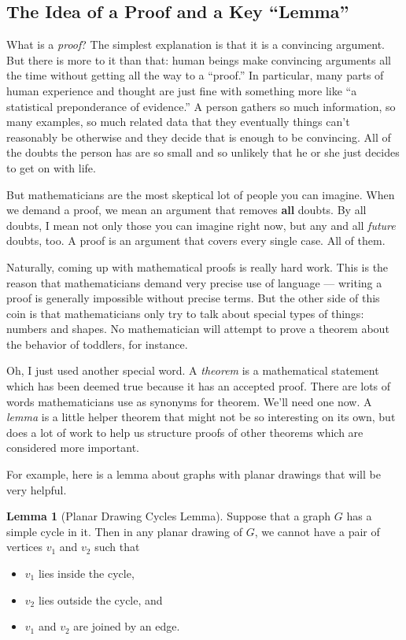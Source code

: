 \documentclass[12pt,letterpaper]{article}
\theoremstyle{definition}
\newtheorem*{lemma}{Lemma}
\begin{document}
\subsection*{The Idea of a Proof and a Key ``Lemma''}

What is a \emph{proof}? The simplest explanation is that it is a convincing argument. But there is more to it 
than that: human beings make convincing arguments all the time without getting all the way to a ``proof.'' 
In particular, many parts of human experience and thought are just fine with something more like ``a statistical 
preponderance of evidence.'' A person gathers so much information, so many examples, so much related data that 
they eventually things can't reasonably be otherwise and they decide that is enough to be convincing. All of the doubts the person has are so small and so unlikely that he or she just decides to get on with life.

But mathematicians are the most skeptical lot of people you can imagine. When we demand a proof, we mean an 
argument that removes \textbf{all} doubts. By all doubts, I mean not only those you can imagine right now, but any
and all \emph{future} doubts, too. A proof is an argument that covers every single case. All of them.

Naturally, coming up with mathematical proofs is really hard work. This is the reason that mathematicians demand
very precise use of language ---  writing a proof is generally impossible without precise terms. But the other 
side of this coin is that mathematicians only try to talk about special types of things: numbers and shapes. No
mathematician will attempt to prove a theorem about the behavior of toddlers, for instance.


Oh, I just used another special word. A \emph{theorem} is a mathematical statement which has been deemed true
because it has an accepted proof. There are lots of words mathematicians use as synonyms for theorem. We'll need 
one now. A \emph{lemma} is a little helper theorem that might not be so interesting on its own, but does a lot of 
work to help us structure proofs of other theorems which are considered more important.

For example, here is a lemma about graphs with planar drawings that will be very helpful.

\begin{lemma}[Planar Drawing Cycles Lemma]
Suppose that a graph $G$ has a simple cycle in it. Then in any planar drawing of $G$, we cannot have a pair of
vertices $v_1$ and $v_2$ such that 
\begin{itemize}
\item $v_1$ lies inside the cycle,
\item $v_2$ lies outside the cycle, and 
\item $v_1$ and $v_2$ are joined by an edge.
\end{itemize}
\end{lemma}
\end{document}
